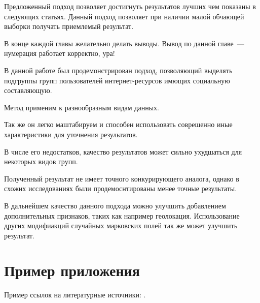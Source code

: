 \documentclass[annotation,times,page4]{itmo-student-thesis}
\begin{document}
Предложенный подход позволяет достигнуть результатов лучших чем показаны в следующих статьях. Данный подход позволяет при наличии малой обчающей выборки получать приемлемый результат.

\chapterconclusion

В конце каждой главы желательно делать выводы. Вывод по данной главе~--- нумерация работает корректно, ура!

\startconclusionpage

В данной работе был продемонстрирован подход, позволяющий выделять подгруппы групп пользователей интернет-ресурсов имющих социальную составляющую.

Метод применим к разнообразным видам данных.

Так же он легко маштабируем и способен использовать соврешенно иные характеристики для уточнения результатов.

В числе его недостатков, качество результатов может сильно ухудшаться для некоторых видов групп.

Полученный результат не имеет точного конкурирующего аналога, однако в схожих исследованиях были продемоснтированы менее точные результаты.

В дальнейшем качество данного подхода можно улучшить добавлением дополнительных признаков, таких как например геолокация. Использование других модифиакций случайных марковских полей так же может улучшить результат.


\printbibliography[heading=trueHeading]

\appendix

\chapter{Пример приложения}

Пример ссылок на литературные источники: \cite{example-english, example-russian}.
\end{document}

